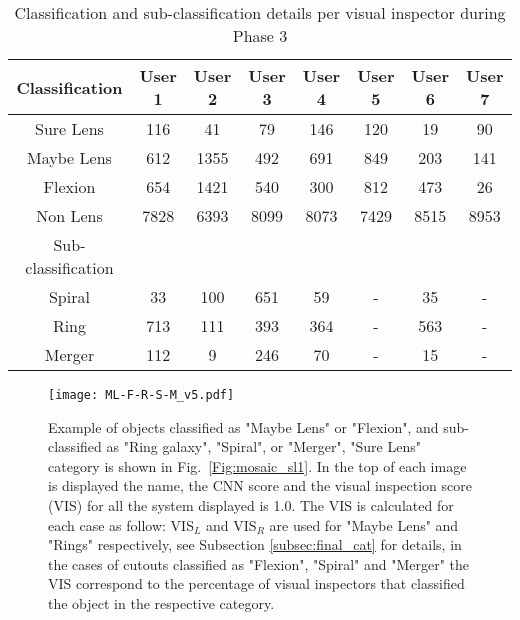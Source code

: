 \documentclass[tradiabstract,twocolumn]{aa}
\begin{document}
\begin{enumerate}
\begin{table*}
\caption{Classification and sub-classification details per visual inspector during Phase 3}             %
\label{table:visualinspection}      %
\centering                          %
\begin{tabular}{c c c c c c c c}        %
\hline\hline                 %
Classification & User 1 & User 2 & User 3 & User 4 & User 5 & User 6 & User 7 \\    %
\hline                        %
Sure Lens   & 116   & 41     & 79    & 146   & 120   & 19    & 90    \\      %
Maybe Lens  & 612   & 1355   & 492   & 691   & 849   & 203   & 141   \\
Flexion     & 654   & 1421   & 540   & 300   & 812   & 473   & 26    \\
Non Lens    & 7828  & 6393   & 8099  & 8073  & 7429  & 8515  & 8953  \\
\hline
Sub-classification      &  &    &    &     &      &     &      \\ 
\hline
Spiral      & 33    & 100    & 651   & 59    & -     & 35    & -     \\ 
Ring        & 713   & 111    & 393   & 364  & -     & 563   & -     \\ 
Merger      & 112   & 9      & 246   & 70    & -     & 15    & -     \\ 
\hline                                   %
\end{tabular}
\end{table*}



\begin{figure*}
\centering
\texttt{[image: ML-F-R-S-M\_v5.pdf]}
\caption{Example of objects classified as "Maybe Lens" or "Flexion", and sub-classified as "Ring galaxy", "Spiral", or "Merger", "Sure Lens" category is shown in Fig.~\ref{Fig:mosaic_sl1}. In the top of each image is displayed the name, the CNN score and the visual inspection score (VIS) for all the system displayed is 1.0. The VIS is calculated for each case as follow: VIS$_L$ and VIS$_R$ are used for "Maybe Lens" and "Rings" respectively, see Subsection \ref{subsec:final_cat} for details, in the cases of cutouts classified as "Flexion", "Spiral" and "Merger" the VIS correspond to the percentage of visual inspectors that classified the object in the respective category.}
\label{Fig:mosaic_MLFRSM}
\end{figure*}



\end{enumerate}
\end{document}
